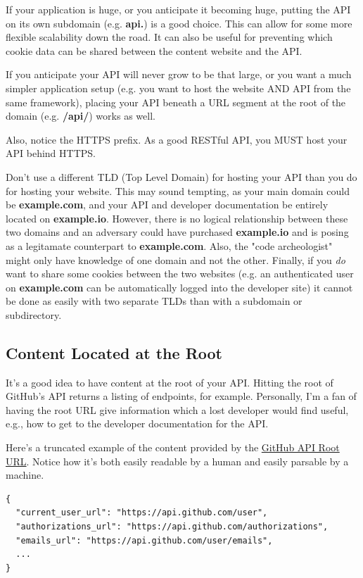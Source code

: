 \documentclass{book}
\begin{document}
If your application is huge, or you anticipate it becoming huge, putting the API on its own subdomain (e.g. \textbf{api.}) is a good choice. This can allow for some more flexible scalability down the road. It can also be useful for preventing which cookie data can be shared between the content website and the API.

If you anticipate your API will never grow to be that large, or you want a much simpler application setup (e.g. you want to host the website AND API from the same framework), placing your API beneath a URL segment at the root of the domain (e.g. \textbf{/api/}) works as well.

Also, notice the HTTPS prefix. As a good RESTful API, you MUST host your API behind HTTPS.

Don't use a different TLD (Top Level Domain) for hosting your API than you do for hosting your website. This may sound tempting, as your main domain could be \textbf{example.com}, and your API and developer documentation be entirely located on \textbf{example.io}. However, there is no logical relationship between these two domains and an adversary could have purchased \textbf{example.io} and is posing as a legitamate counterpart to \textbf{example.com}. Also, the "code archeologist" might only have knowledge of one domain and not the other. Finally, if you \emph{do} want to share some cookies between the two websites (e.g. an authenticated user on \textbf{example.com} can be automatically logged into the developer site) it cannot be done as easily with two separate TLDs than with a subdomain or subdirectory.

\subsection{Content Located at the Root}

It's a good idea to have content at the root of your API. Hitting the root of GitHub's API returns a listing of endpoints, for example. Personally, I'm a fan of having the root URL give information which a lost developer would find useful, e.g., how to get to the developer documentation for the API.

Here's a truncated example of the content provided by the \href{https://api.github.com/}{GitHub API Root URL}. Notice how it's both easily readable by a human and easily parsable by a machine.

\begin{verbatim}
{
  "current_user_url": "https://api.github.com/user",
  "authorizations_url": "https://api.github.com/authorizations",
  "emails_url": "https://api.github.com/user/emails",
  ...
}
\end{verbatim}
\end{document}
